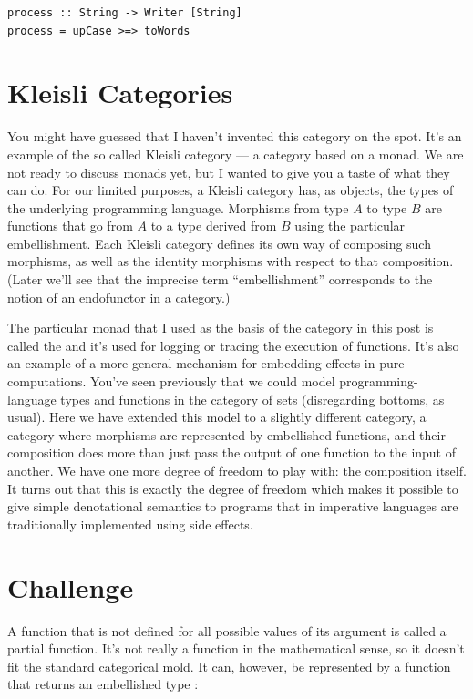 \begin{Verbatim}
process :: String -> Writer [String]
process = upCase >=> toWords
\end{Verbatim}

\section{Kleisli Categories}\label{kleisli-categories}

You might have guessed that I haven't invented this category on the
spot. It's an example of the so called Kleisli category --- a category
based on a monad. We are not ready to discuss monads yet, but I wanted
to give you a taste of what they can do. For our limited purposes, a
Kleisli category has, as objects, the types of the underlying
programming language. Morphisms from type $A$ to type $B$ are functions that
go from $A$ to a type derived from $B$ using the particular embellishment.
Each Kleisli category defines its own way of composing such morphisms,
as well as the identity morphisms with respect to that composition.
(Later we'll see that the imprecise term ``embellishment'' corresponds
to the notion of an endofunctor in a category.)

The particular monad that I used as the basis of the category in this
post is called the  and it's used for logging or
tracing the execution of functions. It's also an example of a more
general mechanism for embedding effects in pure computations. You've
seen previously that we could model programming-language types and
functions in the category of sets (disregarding bottoms, as usual). Here
we have extended this model to a slightly different category, a category
where morphisms are represented by embellished functions, and their
composition does more than just pass the output of one function to the
input of another. We have one more degree of freedom to play with: the
composition itself. It turns out that this is exactly the degree of
freedom which makes it possible to give simple denotational semantics to
programs that in imperative languages are traditionally implemented
using side effects.

\section{Challenge}\label{challenge}

A function that is not defined for all possible values of its argument
is called a partial function. It's not really a function in the
mathematical sense, so it doesn't fit the standard categorical mold. It
can, however, be represented by a function that returns an embellished
type :

